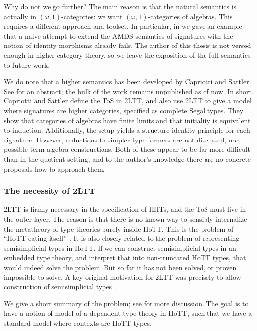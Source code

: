 \documentclass[12pt,a4paper,twoside,openany]{book}
\theoremstyle{remark}
\theoremstyle{definition}
\theoremstyle{theorem}
\begin{document}
Why do not we go further? The main reason is that the natural semantics is
actually in $(\omega,1)$-categories: we want $(\omega,1)$-categories of
algebras. This requires a different approach and toolset. In particular, in
\cite[Section~9]{hiits} we gave an example that a naive attempt to extend the AMDS
semantics of signatures with the notion of identity morphisms already fails.
The author of this thesis is not versed enough in higher category theory, so we
leave the exposition of the full semantics to future work.

We do note that a higher semantics has been developed by Capriotti and
Sattler. See \cite{capriotti2020higher} for an abstract; the bulk of the work
remains unpublished as of now. In short, Capriotti and Sattler define the ToS in
2LTT, and also use 2LTT to give a model where signatures are higher categories,
specified as complete Segal types. They show that categories of algebras have
finite limits and that initiality is equivalent to induction. Additionally, the
setup yields a structure identity principle for each signature. However,
reductions to simpler type formers are not discussed, nor possible term algebra
constructions. Both of these appear to be far more difficult than in the
quotient setting, and to the author's knowledge there are no concrete proposals
how to approach them.

\subsubsection{The necessity of 2LTT}

2LTT is firmly necessary in the specification of HIITs, and the ToS must live in
the outer layer. The reason is that there is no known way to sensibly
internalize the metatheory of type theories purely inside HoTT. This is the
problem of ``HoTT eating itself'' \cite{hott-eat-itself}. It is also closely
related to the problem of representing semisimplicial types in HoTT. If we can
construct semisimplicial types in an embedded type theory, and interpret that
into non-truncated HoTT types, that would indeed solve the problem. But so far
it has not been solved, or proven impossible to solve. A key original motivation
for 2LTT was precisely to allow construction of semisimplicial types
\cite{twolevel}.

We give a short summary of the problem; see \cite[Section~4]{hiits} for more
discussion. The goal is to have a notion of model of a dependent type theory in
HoTT, such that we have a standard model where contexts are HoTT types.
\end{document}
